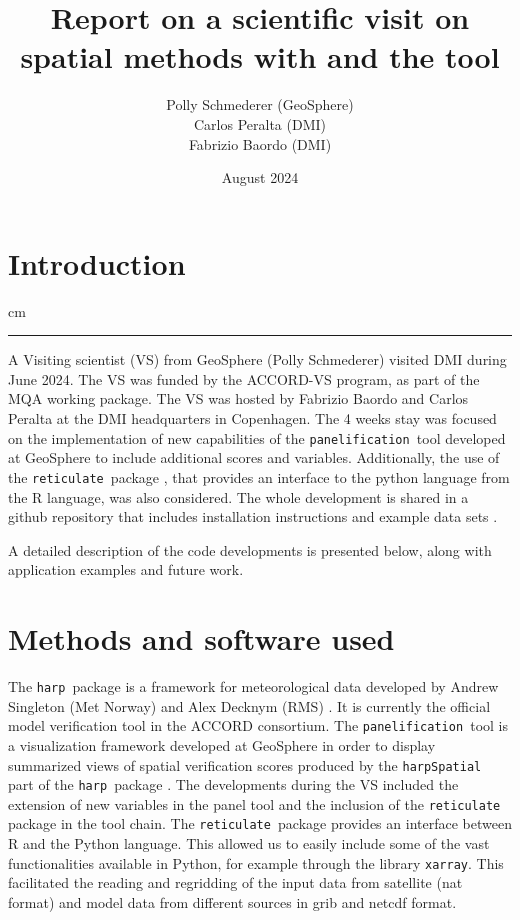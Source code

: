 \documentclass[11pt,a4paper]{article}
\date{}
\title{Report on a scientific visit on spatial methods with \harps and the \panels tool}
\author{Polly Schmederer (GeoSphere) \\ Carlos Peralta (DMI) \\ Fabrizio Baordo (DMI)}
\date{August 2024}
\newcommand{\retis}{\texttt{reticulate }}
\newcommand{\panels}{\texttt{panelification }}
\newcommand{\harps}{\texttt{harp }}
\newcommand{\harpss}{\texttt{harpSpatial }}
\newcommand {\sectionrule}{\vskip -0.9 cm
\color {mygray} \rule [0 cm] {17 cm}{0.1 mm} \color {black}}
\begin{document}
\maketitle
\thispagestyle{fancy}

\section{Introduction}
\sectionrule
A Visiting scientist (VS) from GeoSphere (Polly Schmederer) visited DMI during June 2024. The VS 
was funded by the ACCORD-VS program, as part of the MQA working package. The VS was hosted by Fabrizio Baordo
and Carlos Peralta at the DMI headquarters in Copenhagen. The 4 weeks stay was focused on the 
implementation  of new capabilities of the \panels tool \cite{panel_tool} developed at GeoSphere to include additional scores and variables. 
Additionally, the use of the \retis package \cite{reticulate}, that provides an interface to the python language from the R language, was also considered.
The whole development is shared in a github repository that includes installation instructions and example data sets \cite{repo}.

A detailed description of the code developments is presented below, along with application examples and future work.


\section{Methods and software used}
The \harps package is a framework for meteorological data developed by Andrew Singleton (Met Norway) and Alex Decknym (RMS) \cite{harp}.
It is currently the official model verification tool in the ACCORD consortium.
The \panels tool is a visualization framework developed at GeoSphere in order to display summarized views of spatial verification scores
produced by the \harpss part of the \harps package \cite{panel_tool}.
The developments during the VS included the extension of new variables in the panel tool and the inclusion of the \retis package in the 
tool chain. 
The \retis package provides an interface between R and the Python language.
This allowed us to easily include some of the vast functionalities available
in Python, for example through the library \texttt{xarray}. This facilitated
the reading and regridding of the input data from satellite (nat format)
and model data from different sources in grib and netcdf format.
\end{document}
